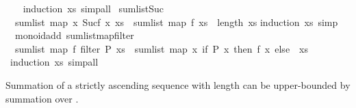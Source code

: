 \begin{isabellebody}
%
\isadelimproof
\ \ %
\endisadelimproof
%
\isatagproof
{}\isamarkupfalse%
\ {\isacharparenleft}{\kern0pt}induction\ xs{\isacharparenright}{\kern0pt}\ simp{\isacharunderscore}{\kern0pt}all%
\endisatagproof
{\isafoldproof}%
%
\isadelimproof
\isanewline
%
\endisadelimproof
\isanewline
{}\isamarkupfalse%
\ sum{\isacharunderscore}{\kern0pt}list{\isacharunderscore}{\kern0pt}Suc{\isacharcolon}{\kern0pt}\isanewline
\ \ {\isachardoublequoteopen}sum{\isacharunderscore}{\kern0pt}list\ {\isacharparenleft}{\kern0pt}map\ {\isacharparenleft}{\kern0pt}{\isasymlambda}x{\isachardot}{\kern0pt}\ Suc{\isacharparenleft}{\kern0pt}f\ x{\isacharparenright}{\kern0pt}{\isacharparenright}{\kern0pt}\ xs{\isacharparenright}{\kern0pt}\ {\isacharequal}{\kern0pt}\ sum{\isacharunderscore}{\kern0pt}list\ {\isacharparenleft}{\kern0pt}map\ f\ xs{\isacharparenright}{\kern0pt}\ {\isacharplus}{\kern0pt}\ length\ xs{\isachardoublequoteclose}\isanewline
%
\isadelimproof
%
\endisadelimproof
%
\isatagproof
{}\isamarkupfalse%
{\isacharparenleft}{\kern0pt}induction\ xs{\isacharsemicolon}{\kern0pt}\ simp{\isacharparenright}{\kern0pt}%
\endisatagproof
{\isafoldproof}%
%
\isadelimproof
\isanewline
%
\endisadelimproof
\isanewline
{}\isamarkupfalse%
\ {\isacharparenleft}{\kern0pt}\ monoid{\isacharunderscore}{\kern0pt}add{\isacharparenright}{\kern0pt}\ sum{\isacharunderscore}{\kern0pt}list{\isacharunderscore}{\kern0pt}map{\isacharunderscore}{\kern0pt}filter{\isacharprime}{\kern0pt}{\isacharcolon}{\kern0pt}\isanewline
\ \ {\isachardoublequoteopen}sum{\isacharunderscore}{\kern0pt}list\ {\isacharparenleft}{\kern0pt}map\ f\ {\isacharparenleft}{\kern0pt}filter\ P\ xs{\isacharparenright}{\kern0pt}{\isacharparenright}{\kern0pt}\ {\isacharequal}{\kern0pt}\ sum{\isacharunderscore}{\kern0pt}list\ {\isacharparenleft}{\kern0pt}map\ {\isacharparenleft}{\kern0pt}{\isasymlambda}x{\isachardot}{\kern0pt}\ if\ P\ x\ then\ f\ x\ else\ {}{\isacharparenright}{\kern0pt}\ xs{\isacharparenright}{\kern0pt}{\isachardoublequoteclose}\isanewline
%
\isadelimproof
\ \ %
\endisadelimproof
%
\isatagproof
{}\isamarkupfalse%
\ {\isacharparenleft}{\kern0pt}induction\ xs{\isacharparenright}{\kern0pt}\ simp{\isacharunderscore}{\kern0pt}all%
\endisatagproof
{\isafoldproof}%
%
\isadelimproof
%
\endisadelimproof
%
\begin{isamarkuptext}%
Summation of a strictly ascending sequence with length 
  can be upper-bounded by summation over .%

\end{isamarkuptext}
\end{isabellebody}
